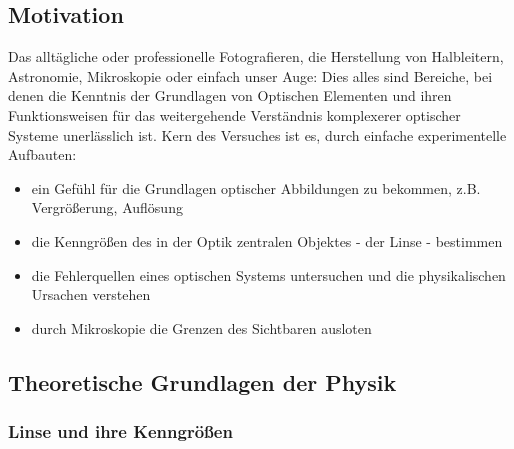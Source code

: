 \subsection{Motivation}
Das alltägliche oder professionelle Fotografieren, die Herstellung von Halbleitern, Astronomie, Mikroskopie oder einfach unser Auge: 
Dies alles sind Bereiche, bei denen die Kenntnis der Grundlagen von Optischen Elementen und ihren Funktionsweisen für das weitergehende Verständnis komplexerer optischer Systeme unerlässlich ist. 
Kern des Versuches ist es, durch einfache experimentelle Aufbauten: 
\begin{itemize}
    \item ein Gefühl für die Grundlagen optischer Abbildungen zu bekommen, z.B. Vergrößerung, Auflösung
    \item die Kenngrößen des in der Optik zentralen Objektes - der Linse - bestimmen
    \item die Fehlerquellen eines optischen Systems untersuchen und die physikalischen Ursachen verstehen
    \item durch Mikroskopie die Grenzen des Sichtbaren ausloten  
\end{itemize}

\subsection[Theoretische Grundlagen der Physik]{Theoretische Grundlagen der Physik \autocite{Skript_1}}
\subsubsection{Linse und ihre Kenngrößen}
